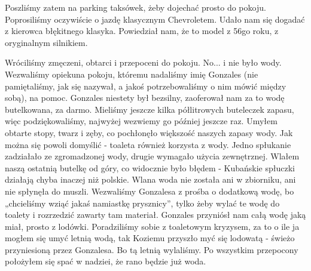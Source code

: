 Poszliśmy zatem na parking taksówek, żeby dojechać prosto do pokoju.
Poprosiliśmy oczywiście o jazdę klasycznym Chevroletem.
Udało nam się dogadać z kierowca błękitnego klasyka.
Powiedział nam, że to model z 56go roku, z oryginalnym silnikiem.
\par Wróciliśmy zmęczeni, obtarci i przepoceni do pokoju.
No...
i nie było wody.
Wezwaliśmy opiekuna pokoju, któremu nadaliśmy imię Gonzales (nie pamiętaliśmy, jak się nazywał, a jakoś potrzebowaliśmy o nim mówić między sobą), na pomoc.
Gonzales niestety był bezsilny, zaoferował nam za to wodę butelkowana, za darmo.
Mieliśmy jeszcze kilka półlitrowych buteleczek zapasu, więc podziękowaliśmy, najwyżej wezwiemy go później jeszcze raz.
Umyłem obtarte stopy, twarz i zęby, co pochłonęło większość naszych zapasy wody.
Jak można się powoli domyślić - toaleta również korzysta z wody.
Jedno spłukanie zadziałało ze zgromadzonej wody, drugie wymagało użycia zewnętrznej.
Wlałem naszą ostatnią butelkę od góry, co widocznie było błędem - Kubańskie spłuczki działają chyba inaczej niż polskie.
Wlana woda nie została ani w zbiorniku, ani nie spłynęła do muszli.
Wezwaliśmy Gonzalesa z prośba o dodatkową wodę, bo „chcieliśmy wziąć jakaś namiastkę prysznicy”, tylko żeby wylać te wodę do toalety i rozrzedzić zawarty tam materiał.
Gonzales przyniósł nam całą wodę jaką miał, prosto z lodówki.
Poradziliśmy sobie z toaletowym kryzysem, za to o ile ja mogłem się umyć letnią wodą, tak Koziemu przyszło myć się lodowatą - świeżo przyniesioną przez Gonzalesa.
Bo tą letnią wylaliśmy.
Po wszystkim przepocony położyłem się spać w nadziei, że rano będzie już woda. 

